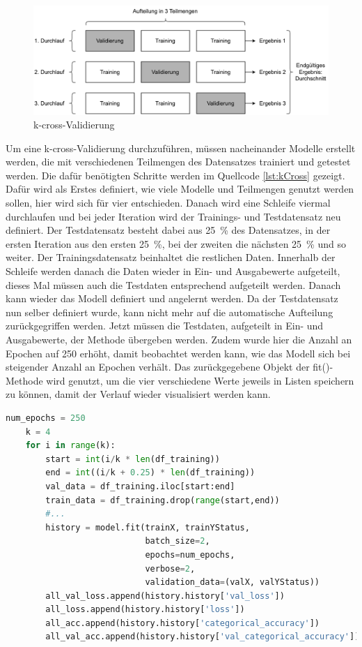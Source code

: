 \begin{figure}[H]
    \centering
    \includegraphics[width = \textwidth]{abbildungen/k_cross.pdf}
    \caption{k-cross-Validierung}
    \label{fig:kCross}
\end{figure}

Um eine k-cross-Validierung durchzuführen, müssen nacheinander Modelle erstellt werden, die mit verschiedenen Teilmengen des Datensatzes trainiert und getestet werden.
Die dafür benötigten Schritte werden im Quellcode \ref*{lst:kCross} gezeigt.
Dafür wird als Erstes definiert, wie viele Modelle und Teilmengen genutzt werden sollen, hier wird sich für vier entschieden. 
Danach wird eine Schleife viermal durchlaufen und bei jeder Iteration wird der Trainings- und Testdatensatz neu definiert. Der Testdatensatz besteht dabei 
aus 25~\% des Datensatzes, in der ersten Iteration aus den ersten 25~\%, bei der zweiten die nächsten 25~\% und so weiter. Der Trainingsdatensatz beinhaltet die restlichen
Daten. Innerhalb der Schleife werden danach die Daten wieder in Ein- und Ausgabewerte aufgeteilt, dieses Mal müssen auch die Testdaten entsprechend aufgeteilt werden.
Danach kann wieder das Modell definiert und angelernt werden. Da der Testdatensatz nun selber definiert wurde, kann nicht mehr auf die automatische Aufteilung zurückgegriffen werden.
Jetzt müssen die Testdaten, aufgeteilt in Ein- und Ausgabewerte, der Methode übergeben werden. Zudem wurde hier die Anzahl an Epochen auf 250 erhöht, damit beobachtet werden kann,
wie das Modell sich bei steigender Anzahl an Epochen verhält. Das zurückgegebene Objekt der fit()-Methode wird genutzt, um die vier verschiedene Werte jeweils in Listen speichern 
zu können, damit der Verlauf wieder visualisiert werden kann.
\begin{lstlisting}[language = python, caption={Aufteilung des Datensatzes in Teilmengen},captionpos=b, label = lst:kCross, float, floatplacement=H]
    num_epochs = 250
    k = 4
    for i in range(k):
        start = int(i/k * len(df_training))
        end = int((i/k + 0.25) * len(df_training))
        val_data = df_training.iloc[start:end] 
        train_data = df_training.drop(range(start,end))
        #...
        history = model.fit(trainX, trainYStatus,
                            batch_size=2,
                            epochs=num_epochs,
                            verbose=2,
                            validation_data=(valX, valYStatus))
        all_val_loss.append(history.history['val_loss'])
        all_loss.append(history.history['loss'])
        all_acc.append(history.history['categorical_accuracy'])
        all_val_acc.append(history.history['val_categorical_accuracy'])
\end{lstlisting}

